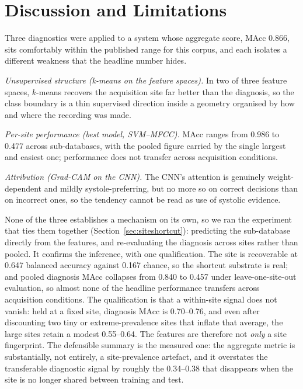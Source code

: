 \section{Discussion and Limitations}

Three diagnostics were applied to a system whose aggregate score, MAcc
\num{0.866}, sits comfortably within the published range for this corpus, and
each isolates a different weakness that the headline number hides.

\emph{Unsupervised structure (k-means on the feature spaces).} In two of three
feature spaces, $k$-means recovers the acquisition site far better than the
diagnosis, so the class boundary is a thin supervised direction inside a geometry
organised by how and where the recording was made.

\emph{Per-site performance (best model, SVM--MFCC).} MAcc ranges from
\num{0.986} to \num{0.477} across sub-databases, with the pooled figure carried
by the single largest and easiest one; performance does not transfer across
acquisition conditions.

\emph{Attribution (Grad-CAM on the CNN).} The CNN's attention is genuinely
weight-dependent and mildly systole-preferring, but no more so on correct
decisions than on incorrect ones, so the tendency cannot be read as use of
systolic evidence.

None of the three establishes a mechanism on its own, so we ran the experiment
that ties them together (Section~\ref{sec:siteshortcut}): predicting the
sub-database directly from the features, and re-evaluating the diagnosis across
sites rather than pooled. It confirms the inference, with one qualification.
The site is recoverable at \num{0.647} balanced accuracy against
\num{0.167} chance, so the shortcut substrate is real; and pooled diagnosis MAcc
collapses from \num{0.840} to \num{0.457} under leave-one-site-out evaluation,
so almost none of the headline performance transfers across acquisition
conditions. The qualification is that a within-site signal does not vanish:
held at a fixed site, diagnosis MAcc is \num{0.70}--\num{0.76}, and even after
discounting two tiny or extreme-prevalence sites that inflate that average, the
large sites retain a modest \num{0.55}--\num{0.64}. The features are therefore
not \emph{only} a site fingerprint. The defensible summary is the measured one:
the aggregate metric is substantially, not entirely, a site-prevalence artefact,
and it overstates the transferable diagnostic signal by roughly the
\num{0.34}--\num{0.38} that disappears when the site is no longer shared between
training and test.

